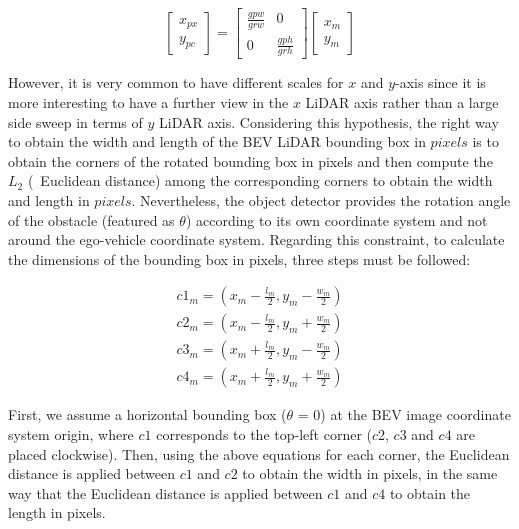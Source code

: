 \begin{equation}
	\label{conversion}
	\left[ \begin{array}{c}
		x_{px}  \\
		y_{pc} \end{array} \right] 
	=
	\left[ \begin{array}{cc}
		\frac{gpw}{grw} & 0  \\
		0 & \frac{gph}{grh} \end{array} \right]
	\left[ \begin{array}{c}
		x_{m}  \\
		y_{m} \end{array} \right] 
\end{equation}

However, it is very common to have different scales for $\textit{x}$ and $\textit{y}$-axis since it is more interesting to have a further view in the $\textit{x}$ LiDAR axis rather than a large side sweep in terms of $\textit{y}$ LiDAR axis. Considering this hypothesis, the right way to obtain the width and length of the \ac{BEV} LiDAR bounding box in $\textit{pixels}$ is to obtain the corners of the rotated bounding box in pixels and then compute the \textit{$L_2$} (\aka \ Euclidean distance) among the corresponding corners to obtain the width and length in $\textit{pixels}$. Nevertheless, the object detector provides the rotation angle of the obstacle (featured as $\theta$) according to its own coordinate system and not around the ego-vehicle coordinate system. Regarding this constraint, to calculate the dimensions of the bounding box in pixels, three steps must be followed:

\begin{equation}
\begin{split}
c1_{m} = (x_{m}-\frac{l_{m}}{2},y_{m}-\frac{w_{m}}{2}) \\
c2_{m} = (x_{m}-\frac{l_{m}}{2},y_{m}+\frac{w_{m}}{2}) \\
c3_{m} = (x_{m}+\frac{l_{m}}{2},y_{m}-\frac{w_{m}}{2}) \\
c4_{m} = (x_{m}+\frac{l_{m}}{2},y_{m}+\frac{w_{m}}{2}) 
\end{split}
\end{equation}
	
First, we assume a horizontal bounding box ($\theta$ = 0) at the BEV image coordinate system origin, where $\textit{c1}$ corresponds to the top-left corner ($\textit{c2}$, $\textit{c3}$ and $\textit{c4}$ are placed clockwise). Then, using the above equations for each corner, the Euclidean distance is applied between $\textit{c1}$ and $\textit{c2}$ to obtain the width in pixels, in the same way that the Euclidean distance is applied between $\textit{c1}$ and $\textit{c4}$ to obtain the length in pixels.

